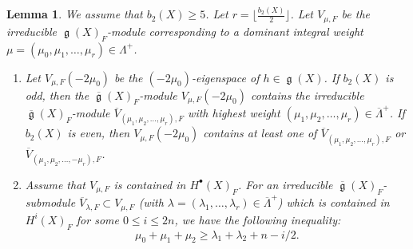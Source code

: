 \documentclass[12pt,reqno]{amsart}
\newtheorem{lem}[thm]{Lemma}
\theoremstyle{definition}
\renewcommand\ge{\mathop{\mathfrak{g}}\nolimits}
\numberwithin{equation}{section}
\begin{document}
\begin{lem}\label{Lemma:restriction of LLV factors to reduced LLV}
    We assume that $b_2(X) \geq 5$.
    Let $r = \lfloor \frac{b_2(X)}{2} \rfloor$.
    Let $V_{\mu, F}$ be the irreducible $\ge(X)_F$-module corresponding to a dominant integral weight $\mu=(\mu_0, \mu_1, \dotsc, \mu_r) \in \Lambda^+$.
    \begin{enumerate}
        \item
        Let $V_{\mu, F}(-2\mu_0)$ be the $(-2\mu_0)$-eigenspace of $h \in \ge(X)$.
    If $b_2(X)$ is odd, then the $\overline{\ge}(X)_F$-module $V_{\mu, F}(-2\mu_0)$ contains the irreducible $\overline{\ge}(X)_F$-module
    $\overline{V}_{(\mu_1, \mu_2, \dotsc, \mu_r), F}$
    with highest weight $(\mu_1, \mu_2, \dotsc, \mu_r) \in \overline{\Lambda}^+$.
    If $b_2(X)$ is even, then $V_{\mu, F}(-2\mu_0)$ contains at least one of $\overline{V}_{(\mu_1, \mu_2, \dotsc, \mu_r), F}$
    or
    $\overline{V}_{(\mu_1, \mu_2, \dotsc, -\mu_r), F}$.
        \item 
        Assume that $V_{\mu, F}$ is contained in $H^\bullet(X)_F$.
        For an irreducible $\overline{\ge}(X)_F$-submodule $\overline{V}_{\lambda, F} \subset V_{\mu, F}$ (with $\lambda=(\lambda_1, \dotsc, \lambda_r) \in \overline{\Lambda}^+$) which is contained in $H^i(X)_F$ for some $0 \leq i \leq 2n$,
        we have the following inequality:
        \[
        \mu_0 + \mu_1 + \mu_2  \geq \lambda_1 + \lambda_2 + n - i/2.
        \]
    \end{enumerate}
\end{lem}
\end{document}
